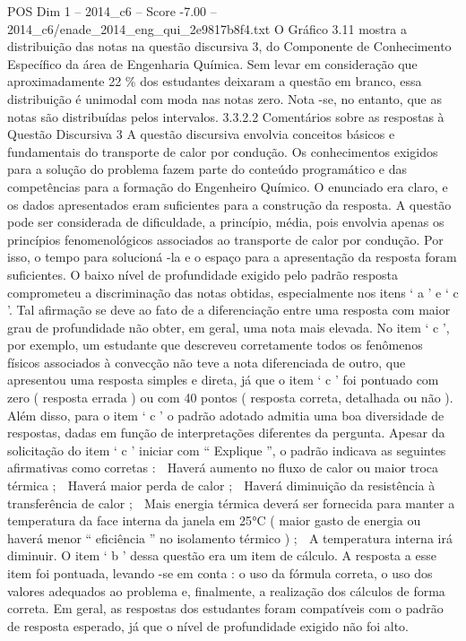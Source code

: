 \begin{textsample}{POS Dim 1 – 2014\_c6 – Score -7.00 – 2014\_c6/enade\_2014\_eng\_qui\_2e9817b8f4.txt}
O Gráfico 3.11 mostra a distribuição das notas na questão discursiva 3, do Componente de Conhecimento Específico da área de Engenharia Química.
Sem levar em consideração que aproximadamente 22 \% dos estudantes deixaram a questão em branco, essa distribuição é unimodal com moda nas notas zero.
Nota -se, no entanto, que as notas são distribuídas pelos intervalos. 3.3.2.2 Comentários sobre as respostas à Questão Discursiva 3 A questão discursiva envolvia conceitos básicos e fundamentais do transporte de calor por condução.
Os conhecimentos exigidos para a solução do problema fazem parte do conteúdo programático e das competências para a formação do Engenheiro Químico.
O enunciado era claro, e os dados apresentados eram suficientes para a construção da resposta.
A questão pode ser considerada de dificuldade, a princípio, média, pois envolvia apenas os princípios fenomenológicos associados ao transporte de calor por condução.
Por isso, o tempo para solucioná -la e o espaço para a apresentação da resposta foram suficientes.
O baixo nível de profundidade exigido pelo padrão resposta comprometeu a discriminação das notas obtidas, especialmente nos itens ‘ a ’ e ‘ c ’.
Tal afirmação se deve ao fato de a diferenciação entre uma resposta com maior grau de profundidade não obter, em geral, uma nota mais elevada.
No item ‘ c ’, por exemplo, um estudante que descreveu corretamente todos os fenômenos físicos associados à convecção não teve a nota diferenciada de outro, que apresentou uma resposta simples e direta, já que o item ‘ c ’ foi pontuado com zero ( resposta errada ) ou com 40 pontos ( resposta correta, detalhada ou não ).
Além disso, para o item ‘ c ’ o padrão adotado admitia uma boa diversidade de respostas, dadas em função de interpretações diferentes da pergunta.
Apesar da solicitação do item ‘ c ’ iniciar com “ Explique ”, o padrão indicava as seguintes afirmativas como corretas :  Haverá aumento no fluxo de calor ou maior troca térmica ;  Haverá maior perda de calor ;  Haverá diminuição da resistência à transferência de calor ;  Mais energia térmica deverá ser fornecida para manter a temperatura da face interna da janela em 25{\EmojiFont °}C ( maior gasto de energia ou haverá menor “ eficiência ” no isolamento térmico ) ;  A temperatura interna irá diminuir.
O item ‘ b ’ dessa questão era um item de cálculo.
A resposta a esse item foi pontuada, levando -se em conta : o uso da fórmula correta, o uso dos valores adequados ao problema e, finalmente, a realização dos cálculos de forma correta.
Em geral, as respostas dos estudantes foram compatíveis com o padrão de resposta esperado, já que o nível de profundidade exigido não foi alto.

\end{textsample}
